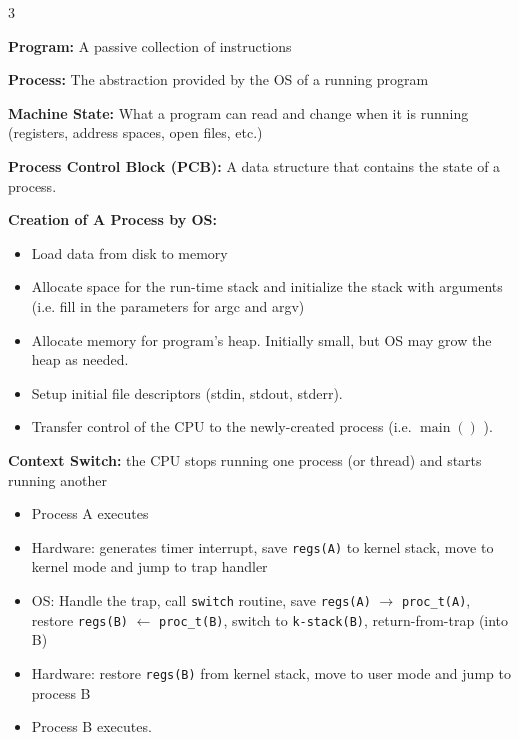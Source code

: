 \documentclass[8pt]{innovativeinnovation-cheatsheet}
\begin{document}
\begin{multicols*}{3}



\textbf{Program:} A passive collection of instructions

\textbf{Process:} The abstraction provided by the OS of a running program

\textbf{Machine State:} What a program can read and change when it is running (registers, address spaces, open files, etc.)

\textbf{Process Control Block (PCB):} A data structure that contains the state of a process.

\textbf{Creation of A Process by OS:}
\begin{itemize}
      \item Load data from disk to memory
      \item Allocate space for the run-time stack and initialize the stack with arguments (i.e. fill in the parameters for argc and argv)
      \item Allocate memory for program's heap. Initially small, but OS may grow the heap as needed.
      \item Setup initial file descriptors (stdin, stdout, stderr).
      \item Transfer control of the CPU to the newly-created process (i.e. $\operatorname{main}()$ ).
\end{itemize}

\textbf{Context Switch:} the CPU stops running one process (or thread) and starts running another
\begin{itemize}
      \item Process A executes
      \item Hardware: generates timer interrupt, save \texttt{regs(A)} to kernel stack, move to kernel mode and jump to trap handler
      \item OS: Handle the trap, call \texttt{switch} routine, save \texttt{regs(A)} $\rightarrow$ \texttt{proc\_t(A)}, restore \texttt{regs(B)} $\leftarrow$ \texttt{proc\_t(B)}, switch to \texttt{k-stack(B)}, return-from-trap (into B)
      \item Hardware: restore \texttt{regs(B)} from kernel stack, move to user mode and jump to process B
      \item Process B executes.
\end{itemize}



\end{multicols*}
\end{document}
